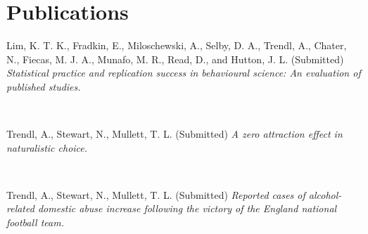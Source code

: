 \documentclass[11pt,a4paper,sans]{moderncv} %
\begin{document}
\section{Publications}
 

Lim, K. T. K., Fradkin, E., Miloschewski, A., Selby, D. A., Trendl, A., Chater, N., Fiecas, M. J. A., Munafo, M. R., Read, D., and Hutton, J. L. (Submitted) \textit{Statistical practice and replication success in behavioural science: An evaluation of published studies.}

\

Trendl, A., Stewart, N., Mullett, T. L. (Submitted) \textit{A zero attraction effect in naturalistic choice.}

\

Trendl, A., Stewart, N., Mullett, T. L. (Submitted) \textit{Reported cases of alcohol-related domestic abuse increase following the victory of the England national football team.}

\end{document}
